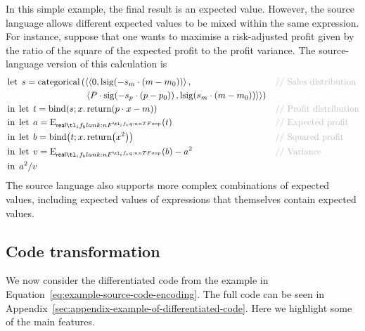 \documentclass[11pt,a4paper]{article}
\theoremstyle{definition}
\theoremstyle{remark}
\begin{document}
In this simple example, the final result is an expected value. However, the source language allows different expected values to be mixed within the same expression. For instance, suppose that one wants to maximise a risk-adjusted profit given by the ratio of the square of the expected profit to the profit variance. The source-language version of this calculation is
\begin{equation*}
  \begin{aligned}
    &\opn[b]{let} \;
      s =
      \opn[b]{categorical}
      \left(
      \left \langle
      \tuple{ 0, \fn[n]{ \opn[b]{lsig} }{ -s_{m} \cdot \left( m - m_{0} \right) } },
      \right.
      \right.
    &&\text{\textcolor{lightgray}{// Sales distribution}}
    \\
    &\qquad \qquad \qquad \qquad \hphantom{a}
      \left.
      \left.
      \tuple{
      P \cdot \fn[n]{ \opn[b]{sig} }{ -s_{p} \cdot \left( p - p_{0} \right) },
      \fn[n]{ \opn[b]{lsig} }{ s_{m} \cdot \left( m - m_{0} \right) }
      }
      \right\rangle
      \right)
    \\
    & \opn[b]{in} \;
      \opn[b]{let} \;
      t = \fn[n]{ \opn[b]{bind} }{s; x . \fn[n]{ \opn[b]{return} }{ p \cdot x - m } }
      &&\text{\textcolor{lightgray}{// Profit distribution}}
    \\
    & \opn[b]{in} \;
      \opn[b]{let} \; a = \fn[n]{ \opn[b]{E}_{\srcreal} }{ t }
      &&\text{\textcolor{lightgray}{// Expected profit}}
    \\
    & \opn[b]{in} \;
      \opn[b]{let} \;
      b = \fn[n]{ \opn[b]{bind} }{ t; x . \fn[n]{ \opn[b]{return} }{ x^{2} } }
      &&\text{\textcolor{lightgray}{// Squared profit}}
    \\
    & \opn[b]{in} \;
      \opn[b]{let} \;
      v = \fn[n]{ \opn[b]{E}_{\srcreal} }{ b } - a^{2}
      &&\text{\textcolor{lightgray}{// Variance}}
    \\
    & \opn[b]{in} \; a^{2} / v
  \end{aligned}
\end{equation*}
The source language also supports more complex combinations of expected values, including expected values of expressions that themselves contain expected values.

\subsection{Code transformation}
\label{sec:code-transformation}

We now consider the differentiated code from the example in Equation~\eqref{eq:example-source-code-encoding}. The full code can be seen in Appendix~\ref{sec:appendix-example-of-differentiated-code}. Here we highlight some of the main features.
\end{document}
